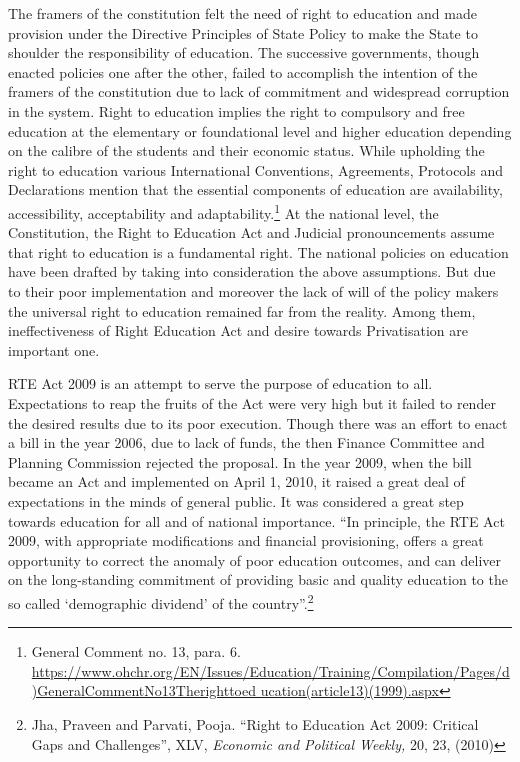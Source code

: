 \begin{multicols}{2}
\noi
The framers of the constitution felt the need of right to education and made provision under
the Directive Principles of State Policy to make the State to shoulder the responsibility of
education. The successive governments, though enacted policies one after the other, failed to
accomplish the intention of the framers of the constitution due to lack of commitment and
widespread corruption in the system. Right to education implies the right to compulsory and
free education at the elementary or foundational level and higher education depending on the
calibre of the students and their economic status. While upholding the right to education
various International Conventions, Agreements, Protocols and Declarations mention that the
essential components of education are availability, accessibility, acceptability and
adaptability.\footnote{General Comment no. 13, para. 6. \url{https://www.ohchr.org/EN/Issues/Education/Training/Compilation/Pages/d)GeneralCommentNo13Therighttoed
ucation(article13)(1999).aspx}} At the national level, the Constitution, the Right to Education Act and Judicial
pronouncements assume that right to education is a fundamental right. The national policies on education have been drafted by taking into consideration the above assumptions. But due
to their poor implementation and moreover the lack of will of the policy makers the universal
right to education remained far from the reality. Among them, ineffectiveness of Right
Education Act and desire towards Privatisation are important one.


\noi
RTE Act 2009 is an attempt to serve the purpose of education to all. Expectations to reap the
fruits of the Act were very high but it failed to render the desired results due to its poor
execution. Though there was an effort to enact a bill in the year 2006, due to lack of funds,
the then Finance Committee and Planning Commission rejected the proposal. In the year
2009, when the bill became an Act and implemented on April 1, 2010, it raised a great deal of
expectations in the minds of general public. It was considered a great step towards education
for all and of national importance. “In principle, the RTE Act 2009, with appropriate
modifications and financial provisioning, offers a great opportunity to correct the anomaly of
poor education outcomes, and can deliver on the long-standing commitment of providing
basic and quality education to the so called ‘demographic dividend’ of the country”.\footnote{Jha, Praveen and Parvati, Pooja. “Right to Education Act 2009: Critical Gaps and Challenges”, XLV, \textit{Economic and Political Weekly,} 20, 23, (2010)}


\end{multicols}
